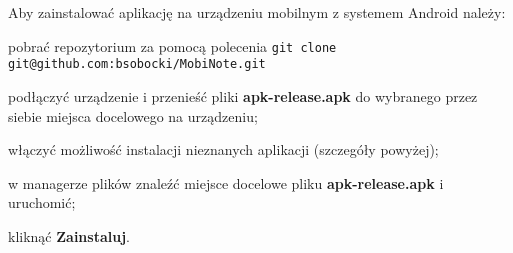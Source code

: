 \documentclass[shortabstract]{iithesis}
\begin{document}
Aby zainstalować aplikację na urządzeniu mobilnym z systemem Android należy:
\begin{compactitem}
    \setlength\itemsep{0mm}
    \item pobrać repozytorium za pomocą polecenia
    \newline
    \verb|git clone git@github.com:bsobocki/MobiNote.git|
    \item podłączyć urządzenie i przenieść pliki \textbf{apk-release.apk} do wybranego przez siebie miejsca docelowego na urządzeniu;
    \item włączyć możliwość instalacji nieznanych aplikacji (szczegóły powyżej);
    \item w managerze plików znaleźć miejsce docelowe pliku \textbf{apk-release.apk} i uruchomić;
    \item kliknąć \textbf{Zainstaluj}.
\end{compactitem}










\end{document}
